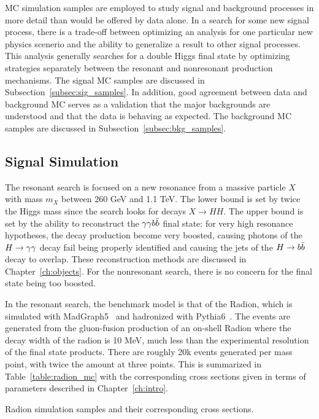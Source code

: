MC simulation samples are employed to study signal and background processes in more detail
than would be offered by data alone. In a search for some new signal process, there is a trade-off
between optimizing an analysis for one particular new physics scenerio and the ability to
generalize a result to other signal processes. This analysis generally searches for a double Higgs final
state by optimizing strategies separately between the resonant and nonresonant production mechanisms.
The signal MC samples are discussed in Subsection~\ref{subsec:sig_samples}.
In addition, good agreement between data
and background MC serves as a validation that the major backgrounds are understood and that
the data is behaving as expected. The background MC samples are discussed in
Subsection~\ref{subsec:bkg_samples}.

\subsection{Signal Simulation\label{subsec:sig_samples}}

The resonant search is focused on a new resonance from a massive particle $X$ with mass $m_X$ between
260 GeV and 1.1 TeV. The lower bound is set by twice the Higgs mass since the search looks for decays
$X\rightarrow HH$. The upper bound is set by the ability to reconstruct the $\gamma\gamma b\bar{b}$ final state: for
very high resonance hypotheses, the decay production become very boosted, causing photons of the
$H\to\gamma\gamma$ decay fail being properly identified and causing the jets of the $H\to b\bar{b}$ decay to overlap.
These reconstruction methods are discussed in Chapter~\ref{ch:objects}. For the nonresonant
search, there is no concern for the final state being too boosted.

In the resonant search, the benchmark model is that of the Radion, which is simulated with
MadGraph5~\cite{Madgraph_Alwall:2011uj} and hadronized with Pythia6~\cite{Pythia6-0}. The events are
generated from the gluon-fusion production of an on-shell Radion where the decay width of the radion
is 10 MeV, much less than the experimental resolution of the final state products. There are roughly
20k events generated per mass point, with twice the amount at three points.
This is summarized in Table~\ref{table:radion_mc} with the corresponding cross sections given in terms
of parameters described in Chapter~\ref{ch:intro}.

\begin{table}[ht]
  \centering
  \renewcommand{\arraystretch}{1.4}
  \caption{Radion simulation samples and their corresponding cross sections.}
  
  \label{table:radion_mc}
\end{table}

